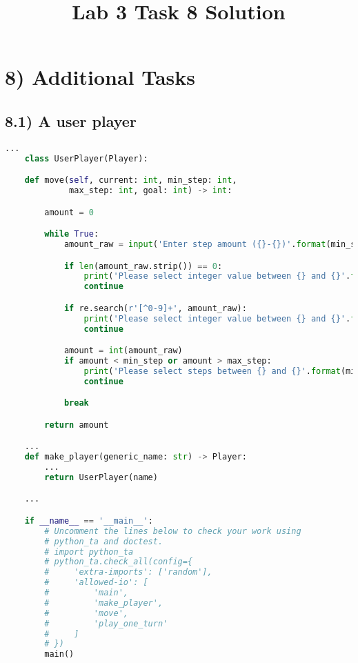 \documentclass[12pt]{article}
\begin{document}
\title{Lab 3 Task 8 Solution}
\date{}
\maketitle

\section*{8) Additional Tasks}

\subsection*{8.1) A user player}

\begin{lstlisting}[language=Python]
    ...
    class UserPlayer(Player):

    def move(self, current: int, min_step: int,
             max_step: int, goal: int) -> int:

        amount = 0

        while True:
            amount_raw = input('Enter step amount ({}-{})'.format(min_step, max_step))

            if len(amount_raw.strip()) == 0:
                print('Please select integer value between {} and {}'.format(min_step, max_step))
                continue

            if re.search(r'[^0-9]+', amount_raw):
                print('Please select integer value between {} and {}'.format(min_step, max_step))
                continue

            amount = int(amount_raw)
            if amount < min_step or amount > max_step:
                print('Please select steps between {} and {}'.format(min_step, max_step))
                continue

            break

        return amount

    ...
    def make_player(generic_name: str) -> Player:
        ...
        return UserPlayer(name)

    ...

    if __name__ == '__main__':
        # Uncomment the lines below to check your work using
        # python_ta and doctest.
        # import python_ta
        # python_ta.check_all(config={
        #     'extra-imports': ['random'],
        #     'allowed-io': [
        #         'main',
        #         'make_player',
        #         'move',
        #         'play_one_turn'
        #     ]
        # })
        main()
\end{lstlisting}
\end{document}
